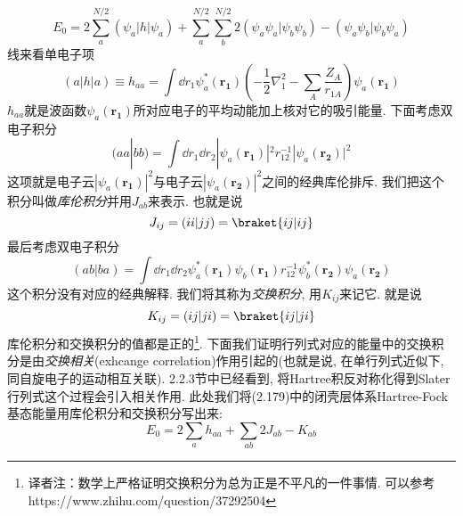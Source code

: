 \begin{equation}
E_0 = 2 \sum_{a}^{N/2}(\psi_a|h|\psi_a) + \sum_{a}^{N/2}\sum_{b}^{N/2}2(\psi_a\psi_a|\psi_b\psi_b) - (\psi_a\psi_b|\psi_b\psi_a)
\end{equation}
线来看单电子项
\begin{equation}
(a|h|a) \equiv h_{aa} = \int\dd{r_1}\psi_a^*(\mathbf{r_1})\left( -\frac{1}{2}\nabla_1^2 - \sum_A\frac{Z_A}{r_{1A}} \right)\psi_a(\mathbf{r_1})
\end{equation}
$h_{aa}$就是波函数$\psi_a(\mathbf{r_1})$所对应电子的平均动能加上核对它的吸引能量. 下面考虑双电子积分
\begin{equation}
(aa|bb) = \int\dd{r_1}\dd{r_2}|\psi_a(\mathbf{r_1})|^2r_{12}^{-1}|\psi_a(\mathbf{r_2})|^2
\end{equation}
这项就是电子云$|\psi_a(\mathbf{r_1})|^2$与电子云$|\psi_a(\mathbf{r_2})|^2$之间的经典库伦排斥. 
我们把这个积分叫做\emph{库伦积分}并用$J_{ab}$来表示. 
也就是说
\begin{equation}
J_{ij} = (ii|jj) = \braket{ij|ij}
\end{equation} 
最后考虑双电子积分
\begin{equation}
(ab|ba) = \int\dd{r_1}\dd{r_2} \psi_a^*(\mathbf{r_1})\psi_b(\mathbf{r_1}) r_{12}^{-1} \psi_b^*(\mathbf{r_2}) \psi_a(\mathbf{r_2})
\end{equation}
这个积分没有对应的经典解释. 
我们将其称为\emph{交换积分}, 
用$K_{ij}$来记它. 
就是说
\begin{equation}
K_{ij} = (ij|ji) = \braket{ij|ji}
\end{equation}
库伦积分和交换积分的值都是正的\footnote{译者注：数学上严格证明交换积分为总为正是不平凡的一件事情. 可以参考 https://www.zhihu.com/question/37292504}. 
下面我们证明行列式对应的能量中的交换积分是由\emph{交换相关}(exhcange correlation)作用引起的(也就是说,
在单行列式近似下, 
同自旋电子的运动相互关联). 
2.2.3节中已经看到, 
将Hartree积反对称化得到Slater行列式这个过程会引入相关作用. 
此处我们将(2.179)中的闭壳层体系Hartree-Fock基态能量用库伦积分和交换积分写出来:
\begin{equation}
E_0 = 2\sum_a h_{aa} + \sum_{ab}2J_{ab} - K_{ab} 
\end{equation}

